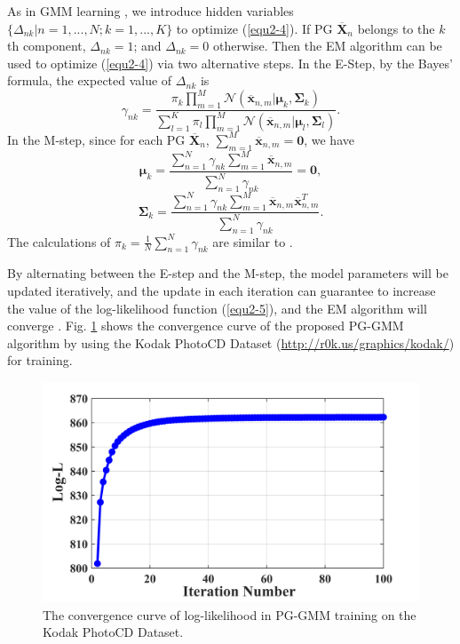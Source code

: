 As in GMM learning \cite{Bishop}, we introduce hidden variables $\{\Delta_{nk}|n=1,...,N;k=1,...,K\}$ to optimize (\ref{equ2-4}). If PG $\bm{\overline{X}}_{n}$ belongs to the $k$th component, $\Delta_{nk}=1$; and $\Delta_{nk}=0$ otherwise. Then the EM algorithm \cite{em} can be used to optimize (\ref{equ2-4}) via two alternative steps. In the E-Step, by the Bayes' formula, the expected value of $\Delta_{nk}$ is
\begin{equation}
\label{equ2-5}
\gamma_{nk}=\frac{\pi_{k}\prod_{m=1}^{M}\mathcal{N}(\bm{\overline{x}}_{n,m}|\bm{\mu}_{k},\bm{\Sigma}_{k})}{\sum_{l=1}^{K}\pi_{l}\prod_{m=1}^{M}\mathcal{N}(\bm{\overline{x}}_{n,m}|\bm{\mu}_{l},\bm{\Sigma}_{l})}.
\end{equation}
In the M-step, since for each PG $\bm{\overline{X}}_{n}$, $\sum_{m=1}^{M}\bm{\overline{x}}_{n,m}=\bm{0}$, we have
\begin{equation}
\label{equ2-6}
\bm{\mu}_{k} = \frac{\sum_{n=1}^{N}\gamma_{nk}\sum_{m=1}^{M}\bm{\overline{x}}_{n,m}}{\sum_{n=1}^{N}\gamma_{nk}}=\bm{0},
\end{equation}
\begin{equation}
\label{equ2-7}
\bm{\Sigma}_{k} = \frac{\sum_{n=1}^{N}\gamma_{nk}\sum_{m=1}^{M}\bm{\overline{x}}_{n,m}\bm{\overline{x}}_{n,m}^{T}}{\sum_{n=1}^{N}\gamma_{nk}}.
\end{equation}
The calculations of $\pi_{k}=\frac{1}{N}\sum_{n=1}^{N}\gamma_{nk}$ are similar to \cite{Bishop}.

By alternating between the E-step and the M-step, the model parameters will be updated iteratively, and the update in each iteration can guarantee to increase the value of the log-likelihood function (\ref{equ2-5}), and the EM algorithm will converge \cite{Bishop,emconvergence}. Fig. \ref{fig2-3} shows the convergence curve of the proposed PG-GMM algorithm by using the Kodak PhotoCD Dataset (\url{http://r0k.us/graphics/kodak/}) for training.
\begin{figure}[t]
\centering
\includegraphics[width=0.75\linewidth]{images/pgpd/cvgc.png}
\caption{The convergence curve of log-likelihood in PG-GMM training on the Kodak PhotoCD Dataset.
}
\label{fig2-3}
\end{figure}

